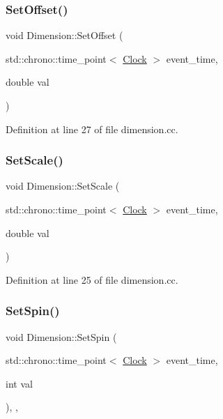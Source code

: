 \subsubsection{\texorpdfstring{Set\+Offset()}{SetOffset()}}
{\footnotesize\ttfamily void Dimension\+::\+Set\+Offset (\begin{DoxyParamCaption}\item[{std\+::chrono\+::time\+\_\+point$<$ \hyperlink{universe_8h_a0ef8d951d1ca5ab3cfaf7ab4c7a6fd80}{Clock} $>$}]{event\+\_\+time,  }\item[{double}]{val }\end{DoxyParamCaption})}



Definition at line 27 of file dimension.\+cc.

\mbox{\label{class_dimension_a7f655ea002e8f9614a8c5cfa1807c49c}} 
\subsubsection{\texorpdfstring{Set\+Scale()}{SetScale()}}
{\footnotesize\ttfamily void Dimension\+::\+Set\+Scale (\begin{DoxyParamCaption}\item[{std\+::chrono\+::time\+\_\+point$<$ \hyperlink{universe_8h_a0ef8d951d1ca5ab3cfaf7ab4c7a6fd80}{Clock} $>$}]{event\+\_\+time,  }\item[{double}]{val }\end{DoxyParamCaption})}



Definition at line 25 of file dimension.\+cc.

\mbox{\label{class_dimension_a8d73c050c67b0226572b4a1b08ae6594}} 
\subsubsection{\texorpdfstring{Set\+Spin()}{SetSpin()}}
{\footnotesize\ttfamily void Dimension\+::\+Set\+Spin (\begin{DoxyParamCaption}\item[{std\+::chrono\+::time\+\_\+point$<$ \hyperlink{universe_8h_a0ef8d951d1ca5ab3cfaf7ab4c7a6fd80}{Clock} $>$}]{event\+\_\+time,  }\item[{int}]{val }\end{DoxyParamCaption})\hspace{0.3cm}{\ttfamily [inline]}, {\ttfamily [final]}, {\ttfamily [virtual]}}



